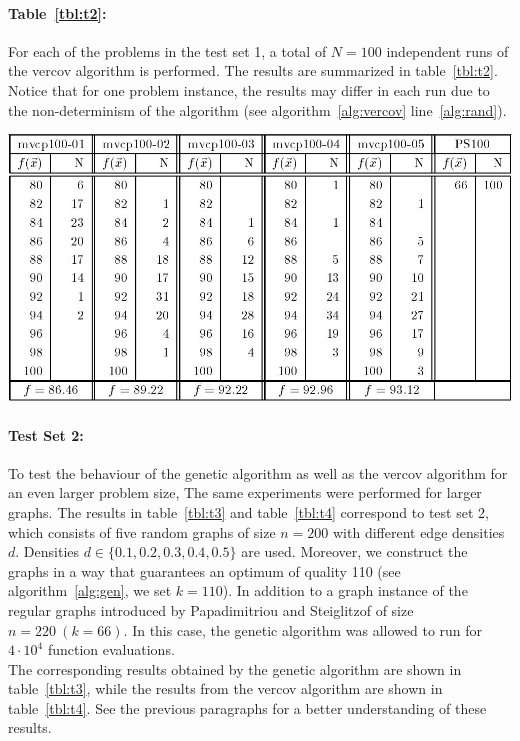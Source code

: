 \documentclass[12pt]{article}
\begin{document}
\paragraph{Table~\ref{tbl:t2}:}
For each of the problems in the test set 1, a total of $N=100$
independent runs of the vercov algorithm is performed.
The results are summarized in table~\ref{tbl:t2}.
Notice that for one problem instance, the results may differ in each run due to the
non-determinism of the algorithm (see algorithm~\ref{alg:vercov} line~\ref{alg:rand}).

\begin{table}[!htbp]
\centering
\includegraphics[width=1\textwidth]{t2}
\caption{%
Experimental results obtained by the vercov algorithm for five random graphs of size $n = 100$ with edge density: $d = 0.1$ (``mvcp100-01''), $d = 0.2$ (``mvcp100-02''), $d = 0.3$ (``mvcp100-03''), $d = 0.5$ (``mvcp100-04''), $d = 0.5$ (``mvcp100-05'') and the regular graph of size $n = 100 \ (k=32)$ from Papadimitriou and Steiglitz (``PS100'').%
}
\label{tbl:t2}
\end{table}

\paragraph{Test Set 2:}
To test the behaviour of the genetic algorithm
as well as the vercov algorithm for an even
larger problem size, The same experiments
were performed for larger graphs.
The results in table~\ref{tbl:t3}
and table~\ref{tbl:t4} correspond to test set 2,
which consists of five random graphs of size
$n = 200$ with different edge densities $d$.
Densities $d \in \{0.1, 0.2, 0.3, 0.4, 0.5\}$ are used.
Moreover, we construct the graphs in a way that guarantees an optimum of quality 110
(see algorithm~\ref{alg:gen}, we set $k = 110$).
In addition to a graph instance of the regular graphs introduced by
Papadimitriou and Steiglitzof of size $n = 220 \ (k=66)$.
In this case, the genetic algorithm
was allowed to run for $4 \cdot 10^4$ function evaluations.\\
The corresponding results obtained by the
genetic algorithm are shown in table~\ref{tbl:t3}, while the results
from the vercov algorithm are shown in table~\ref{tbl:t4}.
See the previous paragraphs for a better understanding of these results.
\end{document}
